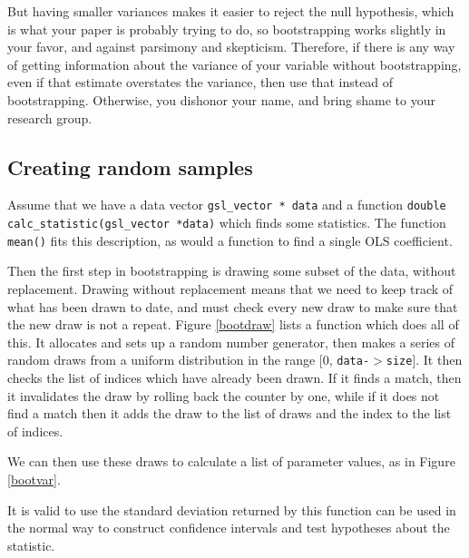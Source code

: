 But having smaller variances makes
it easier to reject the null hypothesis, which is what your paper is
probably trying to do, so bootstrapping works slightly in your favor,
and against parsimony and skepticism. Therefore, if there is any way
of getting information about the variance of your variable without
bootstrapping, even if that estimate overstates the variance, then use
that instead of bootstrapping. Otherwise, you dishonor your name, and
bring shame to your research group.

\subsection{Creating random samples} Assume that we have a
data vector {\tt gsl\_vector * data} and a function {\tt double
calc\_statistic(gsl\_vector *data)} which finds some statistics. The
function {\tt mean()} fits this description, as would a function to find
a single OLS coefficient.

Then the first step in bootstrapping is drawing some subset of the data,
without replacement. Drawing without replacement means that we need to
keep track of what has been drawn to date, and must check every new draw
to make sure that the new draw is not a repeat. Figure \ref{bootdraw} lists a function which
does all of this. It allocates and sets up a random number generator, then
makes a series of random draws from a uniform distribution in the range
[0, {\tt data-$>$size}]. It then checks the list of indices which have
already been drawn. If it finds a match, then it invalidates the draw
by rolling back the counter by one, while if it does not find a match then it
adds the draw to the list of draws and the index to the list of indices.


We can then use these draws to calculate a list of parameter values, as in Figure \ref{bootvar}.

It is valid to use 
the standard deviation returned by this function can be used in the normal way to construct confidence
intervals and test hypotheses about the statistic. 

